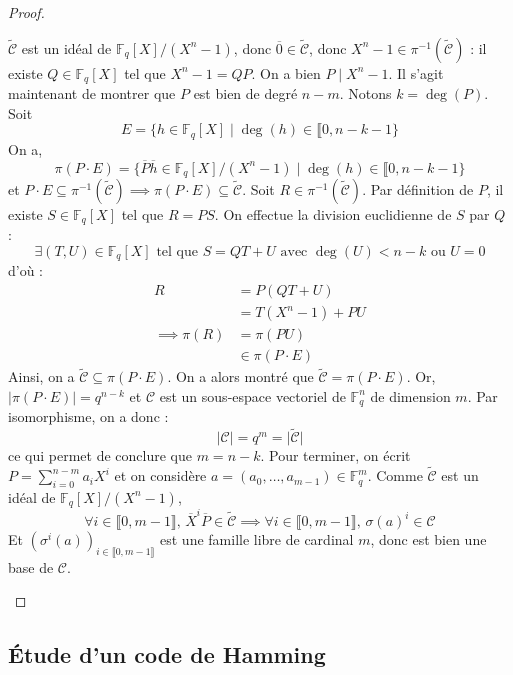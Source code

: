 \begin{proof}
\begin{enumerate}[label=(\roman*)]
      \newpar
      $\widetilde{\mathcal{C}}$ est un idéal de $\mathbb{F}_q[X]/(X^n-1)$, donc $\overline{0} \in \widetilde{\mathcal{C}}$, donc $X^n - 1 \in \pi^{-1}(\widetilde{\mathcal{C}})$ : il existe $Q \in \mathbb{F}_q[X]$ tel que $X^n - 1 = QP$. On a bien $P \mid X^n - 1$.
      \newpar
      Il s'agit maintenant de montrer que $P$ est bien de degré $n-m$. Notons $k = \deg(P)$. Soit
      \[ E = \{ h \in \mathbb{F}_q[X] \mid \deg(h) \in \llbracket 0, n-k-1 \} \]
      On a,
      \[ \pi(P \cdot E) = \{ \overline{P}\overline{h} \in \mathbb{F}_q[X]/(X^n-1) \mid \deg(h) \in \llbracket 0, n-k-1 \} \]
      et $P \cdot E \subseteq \pi^{-1}(\widetilde{\mathcal{C}}) \implies \pi(P\cdot E) \subseteq \widetilde{\mathcal{C}}$.
      \newpar
      Soit $R \in \pi^{-1}(\widetilde{\mathcal{C}})$. Par définition de $P$, il existe $S \in \mathbb{F}_q[X]$ tel que $R = PS$. On effectue la division euclidienne de $S$ par $Q$ :
      \[ \exists (T,U) \in \mathbb{F}_q[X] \text{ tel que } S = QT + U \text{ avec } \deg(U) < n-k \text{ ou } U = 0 \]
      d'où :
      \begin{align*}
        R &= P(QT + U) \\
        &= T(X^n - 1) + PU \\
        \implies \pi(R) &= \pi(PU) \\
        &\in \pi(P \cdot E)
      \end{align*}
      Ainsi, on a $\widetilde{\mathcal{C}} \subseteq \pi(P \cdot E)$. On a alors montré que $\widetilde{\mathcal{C}} = \pi(P \cdot E)$. Or, $\vert \pi(P \cdot E) \vert = q^{n-k}$ et $\mathcal{C}$ est un sous-espace vectoriel de $\mathbb{F}_q^n$ de dimension $m$. Par isomorphisme, on a donc :
      \[ \vert \mathcal{C} \vert = q^m = \vert \widetilde{\mathcal{C}} \vert \]
      ce qui permet de conclure que $m = n-k$.
      \newpar
      Pour terminer, on écrit $P = \sum_{i=0}^{n-m} a_i X^i$ et on considère $a = (a_0, \dots, a_{m-1}) \in \mathbb{F}_q^m$. Comme $\widetilde{\mathcal{C}}$ est un idéal de $\mathbb{F}_q[X]/(X^n-1)$,
      \[ \forall i \in \llbracket 0, m-1 \rrbracket, \, \overline{X}^i \overline{P} \in \widetilde{\mathcal{C}} \implies \forall i \in \llbracket 0, m-1 \rrbracket, \, \sigma(a)^{i} \in \mathcal{C} \]
      Et $(\sigma^{i}(a))_{i \in \llbracket 0, m-1 \rrbracket}$ est une famille libre de cardinal $m$, donc est bien une base de $\mathcal{C}$.
    \end{enumerate}
  \end{proof}

  \subsection{Étude d'un code de Hamming}

